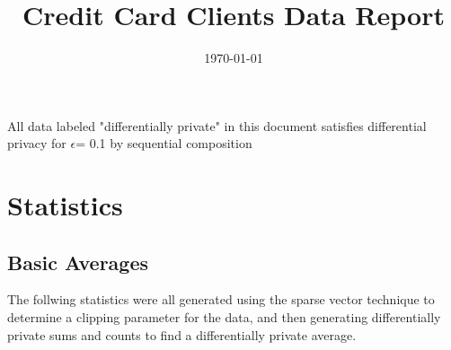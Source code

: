 \documentclass{article}%
\title{Credit Card Clients Data Report}%
\date{\today}%
\begin{document}
%
\normalsize%
\maketitle%
All data labeled "differentially private" in this document satisfies differential privacy for %
$\epsilon$=%
0.1 by sequential composition%
\section{Statistics}%
\label{sec:Statistics}%
\subsection{Basic Averages}%
\label{subsec:BasicAverages}%
The follwing statistics were all generated using the sparse vector technique to determine a clipping parameter for the data, and then generating differentially private sums and counts to find a differentially private average.

%
\end{document}
